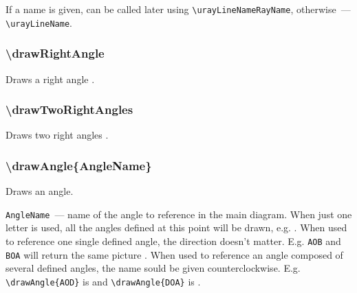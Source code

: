 	If a name is given, can be called later using \texttt{\textbackslash urayLineNameRayName}, otherwise~— \texttt{\textbackslash urayLineName}. 



	




\subsubsection{\textbackslash drawRightAngle}

	Draws a right angle \drawRightAngle.

\subsubsection{\textbackslash drawTwoRightAngles}

	Draws two right angles \drawTwoRightAngles.


\subsubsection{\textbackslash drawAngle\{AngleName\}}\label{drawAngle}

	Draws an angle.
	

	\texttt{AngleName}~— name of the angle to reference in the main diagram. 
	When just one letter is used, all the angles defined at this point will be drawn, e.g. . When used to reference one single defined angle, the direction doesn't matter. 
	E.g. \texttt{AOB} and \texttt{BOA} will return the same picture . 
	When used to reference an angle composed of several defined angles, the name sould be given counterclockwise. 
	E.g. \texttt{\textbackslash drawAngle\{AOD\}} is  and \texttt{\textbackslash drawAngle\{DOA\}} is .
	

